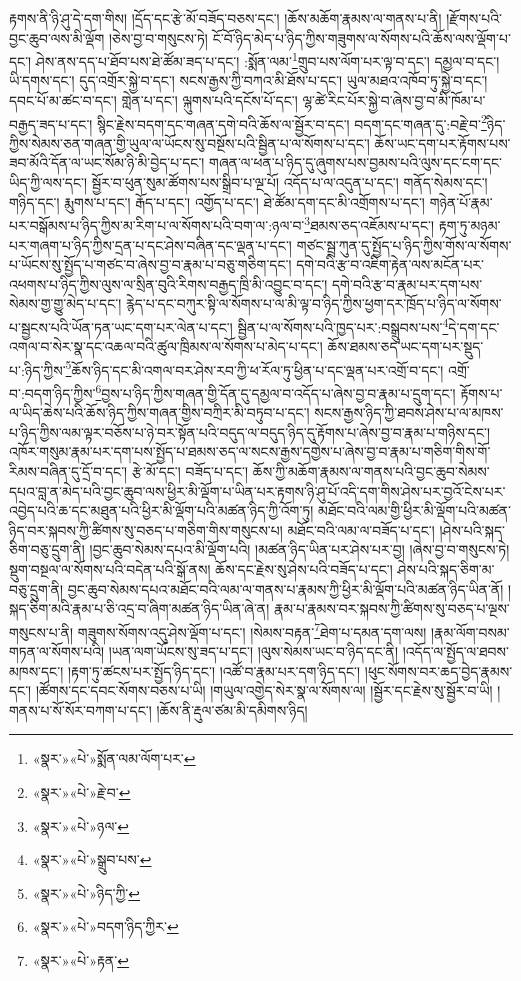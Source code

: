 རྟགས་ནི་ཉི་ཤུ་དེ་དག་གིས། །དྲོད་དང་རྩེ་མོ་བཟོད་བཅས་དང་། །ཆོས་མཆོག་རྣམས་ལ་གནས་པ་ནི། །རྫོགས་པའི་བྱང་ཆུབ་ལས་མི་ལྡོག །ཅེས་བྱ་བ་གསུངས་ཏེ། ངོ་བོ་ཉིད་མེད་པ་ཉིད་ཀྱིས་གཟུགས་ལ་སོགས་པའི་ཆོས་ལས་ལྡོག་པ་དང་། ཤེས་ནས་དད་པ་ཐོབ་པས་ཐེ་ཚོམ་ཟད་པ་དང་། :སྨོན་ལམ་\footnote{«སྣར་»«པེ་»སྨོན་ལམ་ལོག་པར་}གྲུབ་པས་ལོག་པར་ལྟ་བ་དང་། དམྱལ་བ་དང་། ཡི་དགས་དང་། དུད་འགྲོར་སྐྱེ་བ་དང་། སངས་རྒྱས་ཀྱི་བཀའ་མི་ཐོས་པ་དང་། ཡུལ་མཐའ་འཁོབ་ཏུ་སྐྱེ་བ་དང་། དབང་པོ་མ་ཚང་བ་དང་། གླེན་པ་དང་། ལྐུགས་པའི་དངོས་པོ་དང་། ལྷ་ཚེ་རིང་པོར་སྐྱེ་བ་ཞེས་བྱ་བ་མི་ཁོམ་པ་བརྒྱད་ཟད་པ་དང་། སྙིང་རྗེས་བདག་དང་གཞན་དགེ་བའི་ཆོས་ལ་སྦྱོར་བ་དང་། བདག་དང་གཞན་དུ་:བརྗེ་བ་\footnote{«སྣར་»«པེ་»རྗེ་བ་}ཉིད་ཀྱིས་སེམས་ཅན་གཞན་གྱི་ཡུལ་ལ་ཡོངས་སུ་བསྔོས་པའི་སྦྱིན་པ་ལ་སོགས་པ་དང་། ཆོས་ཡང་དག་པར་རྟོགས་པས་ཟབ་མོའི་དོན་ལ་ཡང་སོམ་ཉི་མི་བྱེད་པ་དང་། གཞན་ལ་ཕན་པ་ཉིད་དུ་ཞུགས་པས་བྱམས་པའི་ལུས་དང་ངག་དང་ཡིད་ཀྱི་ལས་དང་། སྦྱོར་བ་ཕུན་སུམ་ཚོགས་པས་སྒྲིབ་པ་ལྔ་པོ། འདོད་པ་ལ་འདུན་པ་དང་། གནོད་སེམས་དང་། གཉིད་དང་། རྨུགས་པ་དང་། རྒོད་པ་དང་། འགྱོད་པ་དང་། ཐེ་ཚོམ་དག་དང་མི་འགྲོགས་པ་དང་། གཉེན་པོ་རྣམ་པར་བསྒོམས་པ་ཉིད་ཀྱིས་མ་རིག་པ་ལ་སོགས་པའི་བག་ལ་:ཉལ་བ་\footnote{«སྣར་»«པེ་»ཉལ་}ཐམས་ཅད་འཇོམས་པ་དང་། རྟག་ཏུ་མཉམ་པར་གཞག་པ་ཉིད་ཀྱིས་དྲན་པ་དང་ཤེས་བཞིན་དང་ལྡན་པ་དང་། གཙང་སྦྲ་ཀུན་དུ་སྤྱོད་པ་ཉིད་ཀྱིས་གོས་ལ་སོགས་པ་ཡོངས་སུ་སྤྱོད་པ་གཙང་བ་ཞེས་བྱ་བ་རྣམ་པ་བཅུ་གཅིག་དང་། དགེ་བའི་རྩ་བ་འཇིག་རྟེན་ལས་མངོན་པར་འཕགས་པ་ཉིད་ཀྱིས་ལུས་ལ་སྲིན་བུའི་རིགས་བརྒྱད་ཁྲི་མི་འབྱུང་བ་དང་། དགེ་བའི་རྩ་བ་རྣམ་པར་དག་པས་སེམས་གྱ་གྱུ་མེད་པ་དང་། རྙེད་པ་དང་བཀུར་སྟི་ལ་སོགས་པ་ལ་མི་ལྟ་བ་ཉིད་ཀྱིས་ཕྱག་དར་ཁྲོད་པ་ཉིད་ལ་སོགས་པ་སྦྱངས་པའི་ཡོན་ཏན་ཡང་དག་པར་ལེན་པ་དང་། སྦྱིན་པ་ལ་སོགས་པའི་ཁྱད་པར་:བསྒྲུབས་པས་\footnote{«སྣར་»«པེ་»སྒྲུབ་པས་}དེ་དག་དང་འགལ་བ་སེར་སྣ་དང་འཆལ་བའི་ཚུལ་ཁྲིམས་ལ་སོགས་པ་མེད་པ་དང་། ཆོས་ཐམས་ཅད་ཡང་དག་པར་སྡུད་པ་:ཉིད་ཀྱིས་\footnote{«སྣར་»«པེ་»ཉིད་ཀྱི་}ཆོས་ཉིད་དང་མི་འགལ་བར་ཤེས་རབ་ཀྱི་ཕ་རོལ་ཏུ་ཕྱིན་པ་དང་ལྡན་པར་འགྲོ་བ་དང་། འགྲོ་བ་:བདག་ཉིད་ཀྱིས་\footnote{«སྣར་»«པེ་»བདག་ཉིད་ཀྱིར་}བྱས་པ་ཉིད་ཀྱིས་གཞན་གྱི་དོན་དུ་དམྱལ་བ་འདོད་པ་ཞེས་བྱ་བ་རྣམ་པ་དྲུག་དང་། རྟོགས་པ་ལ་ཡིད་ཆེས་པའི་ཆོས་ཉིད་ཀྱིས་གཞན་གྱིས་བཀྲིར་མི་བཏུབ་པ་དང་། སངས་རྒྱས་ཉིད་ཀྱི་ཐབས་ཤེས་པ་ལ་མཁས་པ་ཉིད་ཀྱིས་ལམ་ལྟར་བཅོས་པ་ཉེ་བར་སྟོན་པའི་བདུད་ལ་བདུད་ཉིད་དུ་རྟོགས་པ་ཞེས་བྱ་བ་རྣམ་པ་གཉིས་དང་། འཁོར་གསུམ་རྣམ་པར་དག་པས་སྤྱོད་པ་ཐམས་ཅད་ལ་སངས་རྒྱས་དགྱེས་པ་ཞེས་བྱ་བ་རྣམ་པ་གཅིག་གིས་གོ་རིམས་བཞིན་དུ་དྲོ་བ་དང་། རྩེ་མོ་དང་། བཟོད་པ་དང་། ཆོས་ཀྱི་མཆོག་རྣམས་ལ་གནས་པའི་བྱང་ཆུབ་སེམས་དཔའ་བླ་ན་མེད་པའི་བྱང་ཆུབ་ལས་ཕྱིར་མི་ལྡོག་པ་ཡིན་པར་རྟགས་ཉི་ཤུ་པོ་འདི་དག་གིས་ཤེས་པར་བྱའོ་ངེས་པར་འབྱེད་པའི་ཆ་དང་མཐུན་པའི་ཕྱིར་མི་ལྡོག་པའི་མཚན་ཉིད་ཀྱི་འོག་ཏུ། མཐོང་བའི་ལམ་གྱི་ཕྱིར་མི་ལྡོག་པའི་མཚན་ཉིད་བར་སྐབས་ཀྱི་ཚིགས་སུ་བཅད་པ་གཅིག་གིས་གསུངས་པ། མཐོང་བའི་ལམ་ལ་བཟོད་པ་དང་། །ཤེས་པའི་སྐད་ཅིག་བཅུ་དྲུག་ནི། །བྱང་ཆུབ་སེམས་དཔའ་མི་ལྡོག་པའི། །མཚན་ཉིད་ཡིན་པར་ཤེས་པར་བྱ། །ཞེས་བྱ་བ་གསུངས་ཏེ། སྡུག་བསྔལ་ལ་སོགས་པའི་བདེན་པའི་སྒོ་ནས། ཆོས་དང་རྗེས་སུ་ཤེས་པའི་བཟོད་པ་དང་། ཤེས་པའི་སྐད་ཅིག་མ་བཅུ་དྲུག་ནི། བྱང་ཆུབ་སེམས་དཔའ་མཐོང་བའི་ལམ་ལ་གནས་པ་རྣམས་ཀྱི་ཕྱིར་མི་ལྡོག་པའི་མཚན་ཉིད་ཡིན་ནོ། །སྐད་ཅིག་མའི་རྣམ་པ་ཅི་འདྲ་བ་ཞིག་མཚན་ཉིད་ཡིན་ཞེ་ན། རྣམ་པ་རྣམས་བར་སྐབས་ཀྱི་ཚིགས་སུ་བཅད་པ་ལྔས་གསུངས་པ་ནི། གཟུགས་སོགས་འདུ་ཤེས་ལྡོག་པ་དང་། །སེམས་བརྟན་\footnote{«སྣར་»«པེ་»རྟན་}ཐེག་པ་དམན་དག་ལས། །རྣམ་ལོག་བསམ་གཏན་ལ་སོགས་པའི། །ཡན་ལག་ཡོངས་སུ་ཟད་པ་དང་། །ལུས་སེམས་ཡང་བ་ཉིད་དང་ནི། །འདོད་ལ་སྤྱོད་ལ་ཐབས་མཁས་དང་། །རྟག་ཏུ་ཚངས་པར་སྤྱོད་ཉིད་དང་། །འཚོ་བ་རྣམ་པར་དག་ཉིད་དང་། །ཕུང་སོགས་བར་ཆད་བྱེད་རྣམས་དང་། །ཚོགས་དང་དབང་སོགས་བཅས་པ་ཡི། །གཡུལ་འགྱེད་སེར་སྣ་ལ་སོགས་ལ། །སྦྱོར་དང་རྗེས་སུ་སྦྱོར་བ་ཡི། །གནས་པ་སོ་སོར་བཀག་པ་དང་། །ཆོས་ནི་རྡུལ་ཙམ་མི་དམིགས་ཉིད། 